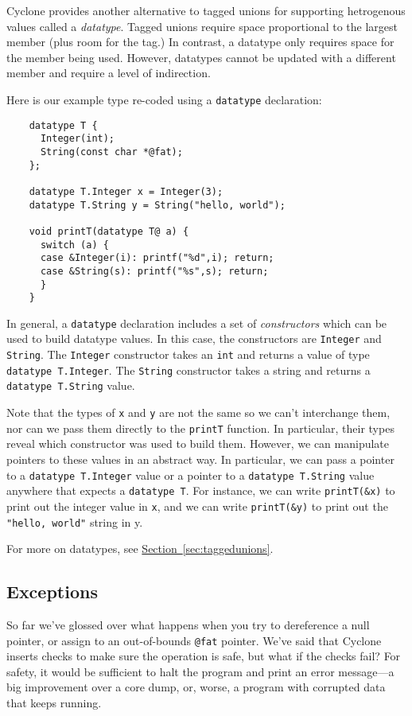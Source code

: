 Cyclone provides another alternative to tagged unions for supporting
hetrogenous values called a \emph{datatype}.  Tagged
unions require space proportional to the largest member (plus room
for the tag.)  In contrast, a datatype only requires space for the
member being used.  However, datatypes cannot be updated with a
different member and require a level of indirection. 

Here is our example type re-coded using a \texttt{datatype} declaration:
\begin{verbatim}
    datatype T {
      Integer(int);
      String(const char *@fat);
    };

    datatype T.Integer x = Integer(3);
    datatype T.String y = String("hello, world");

    void printT(datatype T@ a) {
      switch (a) {
      case &Integer(i): printf("%d",i); return;
      case &String(s): printf("%s",s); return;
      }
    }
\end{verbatim}
In general, a \texttt{datatype} declaration includes a set of
\emph{constructors} which can be used to build datatype values.
In this case, the constructors are \texttt{Integer} and \texttt{String}.
The \texttt{Integer} constructor takes an \texttt{int} and returns
a value of type \texttt{datatype T.Integer}.  The \texttt{String}
constructor takes a string and returns a \texttt{datatype T.String}
value.  

Note that the types of \texttt{x} and \texttt{y} are not 
the same so we can't interchange them, nor can we pass them
directly to the \texttt{printT} function.  In particular,
their types reveal which constructor was used to build
them.  However, we can manipulate pointers to these values
in an abstract way.  In particular, 
we can pass a pointer to a \texttt{datatype T.Integer} value
or a pointer to a \texttt{datatype T.String} value 
anywhere that expects a \texttt{datatype T}.  For instance,
we can write \texttt{printT(\&x)} to print out the integer 
value in \texttt{x}, and we can write \texttt{printT(\&y)}
to print out the \texttt{"hello, world"} string in y.

For more on datatypes, see
\hyperref[{sec:taggedunions}]{Section~\ref{sec:taggedunions}}.

\subsection{Exceptions}

So far we've glossed over what happens when you try to dereference a
null pointer, or assign to an out-of-bounds \texttt{@fat} pointer.
We've said that Cyclone inserts checks to make sure the operation is
safe, but what if the checks fail?  For safety, it would be sufficient
to halt the program and print an error message---a big improvement
over a core dump, or, worse, a program with corrupted data that keeps
running.

